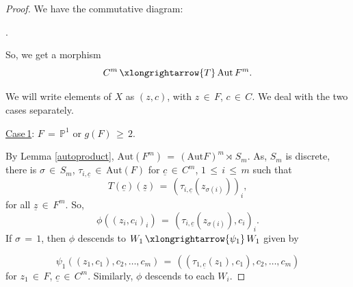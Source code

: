 \documentclass[12pt,reqno]{amsart}
\theoremstyle{definition}
\numberwithin{equation}{section}
\begin{document}
\begin{proof}
We have the commutative diagram:

\begin{center}
.
\end{center}
So, we get a morphism 
\begin{equation}\label{map to aut}
C^{m}\,\xlongrightarrow{T}\, \textrm{Aut}\,F^{m}.
\end{equation}

We will write elements of $X$ as $(z,c)$, with $z\,\in\, F$, $c\,\in\, C.$
We deal with the two cases separately.

\underline{Case\,1}: $F\,=\, \mathbb{P}^{1}$ or $g(F)\,\geq\, 2$.

By Lemma \ref{autoproduct}, $\textrm{Aut}(F^{m})\,=\, (\textrm{Aut}F)^{m} \rtimes\, S_{m}$. As, $S_{m}$ is discrete, there is $\sigma\,\in\, S_{m}$, $\tau_{i,\underline{c}}\,\in\, \textrm{Aut}(F)$ for $\underline{c}\,\in\, C^{m}$, $1\,\leq\,i\,\leq\,m$ such that
\begin{equation*}
T(\underline{c})(\underline{z})\,=\, (\tau_{i,\underline{c}}(z_{\sigma(i)}))_{i},    
\end{equation*} for all $\underline{z}\,\in\, F^m.$
So, 
\begin{equation}\label{horr p1}
\phi((z_{i},c_{i})_{i})\,=\, (\tau_{i,\underline{c}}(z_{\sigma(i)}), c_{i})_{i}. 
\end{equation}
If $\sigma\,=\, 1$, then $\phi$ descends to $W_{1}\,\xlongrightarrow{\psi_{1}}\,W_{1}$ given by 

\begin{equation*}
\psi_{1}((z_{1},c_{1}), c_{2},\ldots, c_{m}) \,=\, \left((\tau_{1,\underline{c}}(z_{1}), c_{1}),c_{2},\ldots,c_{m}\right)   
\end{equation*}
for $z_{1}\,\in\,F$, $\underline{c}\,\in\,C^{m}$. Similarly, $\phi$ descends to each $W_{i}$. 


\end{proof}
\end{document}
